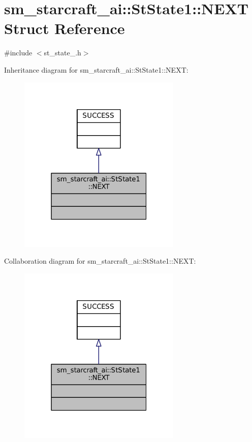 \hypertarget{structsm__starcraft__ai_1_1StState1_1_1NEXT}{}\section{sm\+\_\+starcraft\+\_\+ai\+:\+:St\+State1\+:\+:N\+E\+XT Struct Reference}
\label{structsm__starcraft__ai_1_1StState1_1_1NEXT}


{\ttfamily \#include $<$st\+\_\+state\+\_.\+h$>$}



Inheritance diagram for sm\+\_\+starcraft\+\_\+ai\+:\+:St\+State1\+:\+:N\+E\+XT\+:
\nopagebreak
\begin{figure}[H]
\begin{center}
\leavevmode
\includegraphics[width=220pt]{structsm__starcraft__ai_1_1StState1_1_1NEXT__inherit__graph}
\end{center}
\end{figure}


Collaboration diagram for sm\+\_\+starcraft\+\_\+ai\+:\+:St\+State1\+:\+:N\+E\+XT\+:
\nopagebreak
\begin{figure}[H]
\begin{center}
\leavevmode
\includegraphics[width=220pt]{structsm__starcraft__ai_1_1StState1_1_1NEXT__coll__graph}
\end{center}
\end{figure}


